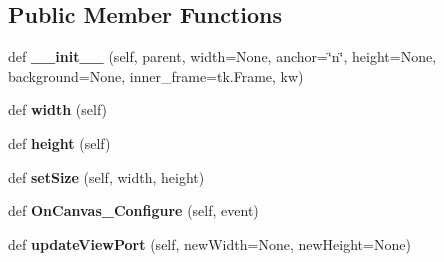 \subsection*{Public Member Functions}
\begin{DoxyCompactItemize}
\item 
\mbox{\label{class_c_utils_1_1_utils_1_1_u_i_1_1_controls_1_1_scrollable_container_a6032eb960798bc757a7e12247577f1a0}} 
def {\bfseries \+\_\+\+\_\+init\+\_\+\+\_\+} (self, parent, width=None, anchor=\char`\"{}n\char`\"{}, height=None, background=None, inner\+\_\+frame=tk.\+Frame, kw)
\item 
\mbox{\label{class_c_utils_1_1_utils_1_1_u_i_1_1_controls_1_1_scrollable_container_abf5c3c9eaedca5fbf769d8f13daf83c8}} 
def {\bfseries width} (self)
\item 
\mbox{\label{class_c_utils_1_1_utils_1_1_u_i_1_1_controls_1_1_scrollable_container_a7f73ca3b6b06cab6bef4f2f023589144}} 
def {\bfseries height} (self)
\item 
\mbox{\label{class_c_utils_1_1_utils_1_1_u_i_1_1_controls_1_1_scrollable_container_a63bcca89b21de7ac9fbbab7d340f3945}} 
def {\bfseries set\+Size} (self, width, height)
\item 
\mbox{\label{class_c_utils_1_1_utils_1_1_u_i_1_1_controls_1_1_scrollable_container_aa8d0952e32b7b85a6191d8d413cb9f39}} 
def {\bfseries On\+Canvas\+\_\+\+Configure} (self, event)
\item 
\mbox{\label{class_c_utils_1_1_utils_1_1_u_i_1_1_controls_1_1_scrollable_container_a67fdce12ad3df5d0b98fa9a0d409f6f3}} 
def {\bfseries update\+View\+Port} (self, new\+Width=None, new\+Height=None)
\end{DoxyCompactItemize}
